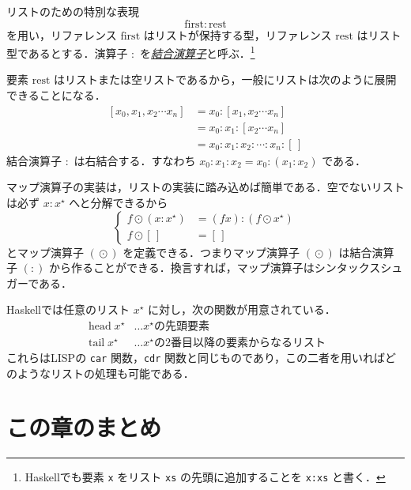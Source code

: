 \documentclass[a4paper]{jsbook}
\newcommand{\programminglanguage}[1]{\textsf{#1}}
\newcommand{\haskell}{\programminglanguage{Haskell}}
\newcommand{\lisp}{\programminglanguage{LISP}}
\newcommand{\keyword}[1]{{\underline{\emph{#1}}}}
\newcommand{\code}[1]{\texttt{#1}}
\newcommand{\mSpecialVar}[1]{\mathrm{#1}} %
\newcommand{\mFirstVar}{\mSpecialVar{first}}
\newcommand{\mRestVar}{\mSpecialVar{rest}}
\newcommand{\mListWith}[1]{\left[#1\right]}
\newcommand{\mEmptyList}{{[\,]}}
\newcommand{\mList}[1]{{#1}^\mathrm{\star}}
\DeclareMathOperator{\mMapList}{\odot}
\DeclareMathOperator{\mHead}{head}
\DeclareMathOperator{\mTail}{tail}
\newcommand{\mathVarKeyword}[1]{\operatorname{\mathrm{#1}}}
\newcommand{\mFirstVar}{\mathVarKeyword{first}}
\begin{document}
リストのための特別な表現
\begin{equation}
\mFirstVar:\mRestVar
\end{equation}
を用い，リファレンス $\mFirstVar$ はリストが保持する型，リファレンス $\mRestVar$ はリスト型であるとする．演算子 $:$ を\keyword{結合演算子}と呼ぶ．\footnote{\haskell でも要素 \code{x} をリスト \code{xs} の先頭に追加することを \code{x:xs} と書く．}

要素 $\mRestVar$ はリストまたは空リストであるから，一般にリストは次のように展開できることになる．
\begin{align*}
\mListWith{x_0,x_1,x_2\dotsb x_n}
  &=x_0:\mListWith{x_1,x_2\dotsb x_n}\\
  &=x_0:x_1:\mListWith{x_2\dotsb x_n}\\
  &=x_0:x_1:x_2:\dotsb:x_n:\mEmptyList
\end{align*}
結合演算子 $:$ は右結合する．すなわち $x_0:x_1:x_2=x_0:(x_1:x_2)$ である．

マップ演算子の実装は，リストの実装に踏み込めば簡単である．空でないリストは必ず $x:\mList{x}$ へと分解できるから
\begin{equation}
\left\{
\begin{split}
f\mMapList{}(x:\mList{x})
  &=(fx):(f\mMapList\mList{x})\\
f\mMapList\mEmptyList
  &=\mEmptyList
\end{split}
\right.
\end{equation}
とマップ演算子 $(\mMapList)$ を定義できる．つまりマップ演算子 $(\mMapList)$ は結合演算子 $(:)$ から作ることができる．換言すれば，マップ演算子はシンタックスシュガーである．

\haskell では任意のリスト $\mList{x}$ に対し，次の関数が用意されている．
\begin{align*}
\mHead\mList{x}&\dots\text{$\mList{x}$の先頭要素}\\
\mTail\mList{x}&\dots\text{$\mList{x}$の2番目以降の要素からなるリスト}
\end{align*}
これらは\lisp  の \code{car} 関数，\code{cdr} 関数と同じものであり，この二者を用いればどのようなリストの処理も可能である．

\section{この章のまとめ}
\end{document}
